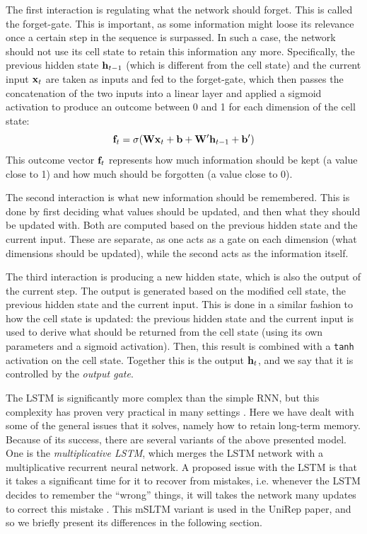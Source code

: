 \documentclass[a4paper,12pt]{article}
\begin{document}
The first interaction is regulating what the network should forget. This is called the forget-gate. This is important, as some information might loose its relevance once a certain step in the sequence is surpassed. In such a case, the network should not use its cell state to retain this information any more. Specifically, the previous hidden state $\mathbf{ h }_{t-1}$ (which is different from the cell state) and the current input $\mathbf{ x }_t$ are taken as inputs and fed to the forget-gate, which then passes the concatenation of the two inputs into a linear layer and applied a sigmoid activation to produce an outcome between 0 and 1 for each dimension of the cell state:
\[ \mathbf{ f }_t = \sigma {\mathopen{} \left( \mathbf{ W } \mathbf{ x }_t + \mathbf{ b } + \mathbf{ W }'\mathbf{ h }_{t-1} + \mathbf{ b }'  \right) \mathclose{}} \]
This outcome vector $\mathbf{ f }_t$ represents how much information should be kept (a value close to 1) and how much should be forgotten (a value close to 0).

The second interaction is what new information should be remembered. This is done by first deciding what values should be updated, and then what they should be updated with. Both are computed based on the previous hidden state and the current input. These are separate, as one acts as a gate on each dimension (what dimensions should be updated), while the second acts as the information itself.

The third interaction is producing a new hidden state, which is also the output of the current step. The output is generated based on the modified cell state, the previous hidden state and the current input. This is done in a similar fashion to how the cell state is updated: the previous hidden state and the current input is used to derive what should be returned from the cell state (using its own parameters and a sigmoid activation). Then, this result is combined with a \texttt{tanh} activation on the cell state. Together this is the output $\mathbf{ h }_t$, and we say that it is controlled by the \textit{output gate}.

The LSTM is significantly more complex than the simple RNN, but this complexity has proven very practical in many settings . Here we have dealt with some of the general issues that it solves, namely how to retain long-term memory. Because of its success, there are several variants of the above presented model. One is the \textit{multiplicative LSTM}, which merges the LSTM network with a multiplicative recurrent neural network. A proposed issue with the LSTM is that it takes a significant time for it to recover from mistakes, i.e. whenever the LSTM decides to remember the ``wrong'' things, it will takes the network many updates to correct this mistake \cite{krause2016multiplicative}. 
This mSLTM variant is used in the UniRep paper, and so we briefly present its differences in the following section. 
\end{document}
